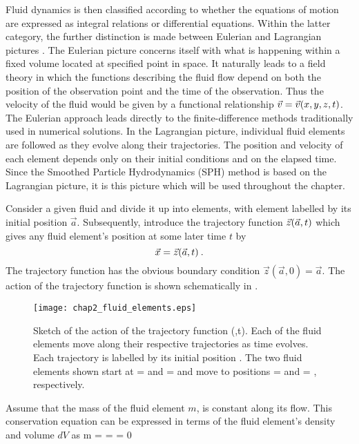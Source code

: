 Fluid dynamics is then classified according to whether the equations of motion are
expressed as integral relations or differential equations.  Within the latter category,
the further distinction is made between Eulerian and Lagrangian pictures
.  The Eulerian picture concerns itself with what is
happening within a fixed volume located at specified point in space.
It naturally leads to a field theory in which the functions describing
the fluid flow depend on both the position of the observation point and the time of the
observation.  Thus the velocity of the fluid would be given by a functional relationship
$\vec {v} = \vec {v}(x,y,z,t)$.  The Eulerian approach leads directly to the finite-difference
methods traditionally used in numerical solutions.  In the Lagrangian picture,
individual fluid elements are followed as they evolve along their trajectories.
The position and velocity of each element depends only on their initial conditions and on
the elapsed time.
Since the Smoothed Particle Hydrodynamics (SPH) method is based on the Lagrangian picture,
it is this picture which will be used throughout the chapter.

Consider a given fluid and divide it up into elements, with element labelled by its
initial position ${\vec a}$.  Subsequently, introduce the trajectory function
$\vec {z}(\vec {a},t)$ which gives any fluid element's position at some
later time $t$ by
\begin{equation}
    \vec {x} = \vec {z}(\vec {a},t) \: .
\end{equation}
The trajectory function has the obvious boundary condition
${\vec z}({\vec a},0) = {\vec a}$.
The action of the trajectory function is shown schematically in .

\begin{figure}
\centerline{
   \texttt{[image: chap2\_fluid\_elements.eps]}}
   \caption{Sketch of the action of the trajectory function (,t).  Each of
   the fluid elements move along their respective trajectories as time evolves.  Each
   trajectory is labelled by its initial position .  The two fluid elements shown
   start at  =  and  =  and move to positions
    =  and  = , respectively.}\label{fig:fluid_elements}
\end{figure}

Assume that the mass of the fluid element $m$, is constant along its flow.
This conservation equation can be expressed in terms of the fluid element's density \gr
and volume $dV$ as
\be\label{eq:mass_con}
   m =   =   = 0 \eqp
\ee


